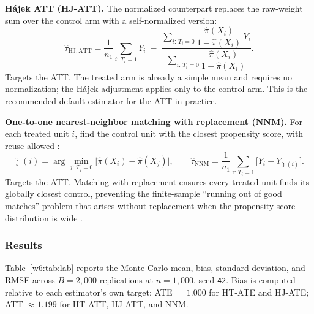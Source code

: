 \documentclass[master.tex]{subfiles}
\begin{document}
\medskip\noindent\textbf{Hájek ATT (HJ-ATT).}
The normalized counterpart replaces the raw-weight sum over the control
arm with a self-normalized version:
\[
  \hat\tau_{\mathrm{HJ,ATT}}
  = \frac{1}{n_1}\sum_{i:\,T_i=1} Y_i
  \;-\;
  \frac{\displaystyle\sum_{i:\,T_i=0}
    \dfrac{\hat\pi(X_i)}{1-\hat\pi(X_i)}\,Y_i}
  {\displaystyle\sum_{i:\,T_i=0}
    \dfrac{\hat\pi(X_i)}{1-\hat\pi(X_i)}}.
\]
Targets the ATT.  The treated arm is already a simple mean and requires
no normalization; the Hájek adjustment applies only to the control arm.
This is the recommended default estimator for the ATT in practice.

\medskip\noindent\textbf{One-to-one nearest-neighbor matching with
replacement (NNM).}
For each treated unit $i$, find the control unit with the closest
propensity score, with reuse allowed \citep{abadie2006large}:
\[
  \hat\jmath(i) = \arg\min_{j:\, T_j=0}
    \bigl|\hat\pi(X_i) - \hat\pi(X_j)\bigr|,
  \qquad
  \hat\tau_{\mathrm{NNM}}
  = \frac{1}{n_1}\sum_{i:\,T_i=1}
    \bigl[Y_i - Y_{\hat\jmath(i)}\bigr].
\]
Targets the ATT.  Matching with replacement ensures every treated unit
finds its globally closest control, preventing the finite-sample
``running out of good matches'' problem that arises without replacement
when the propensity score distribution is wide \citep{abadie2006large}.

\subsubsection*{Results}

Table~\ref{w6:tab:lab} reports the Monte Carlo mean, bias, standard
deviation, and RMSE across $B = 2{,}000$ replications at $n = 1{,}000$,
seed \texttt{42}.  Bias is computed relative to each estimator's own
target: ATE $= 1.000$ for HT-ATE and HJ-ATE; ATT $\approx 1.199$ for
HT-ATT, HJ-ATT, and NNM.
\end{document}
